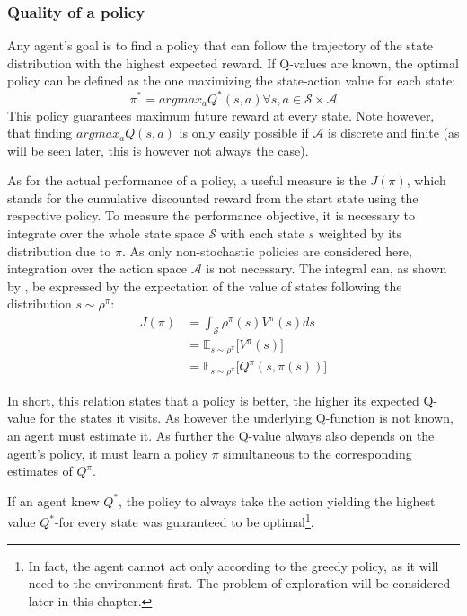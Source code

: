 \subsubsection{Quality of a policy}

Any agent's goal is to find a policy that can follow the trajectory of the state distribution with the highest expected reward. If Q-values are known, the optimal policy can be defined as the one maximizing the state-action value for each state:
\begin{equation}
	\pi^* = argmax_aQ^*(s,a) \forall s,a \in \mathcal{S} \times \mathcal{A}
\end{equation}
This policy guarantees maximum future reward at every state. Note however, that finding $argmax_aQ(s,a)$ is only easily possible if $\mathcal{A}$ is discrete and finite (as will be seen later, this is however not always the case).

As for the actual performance of a policy, a useful measure is the  $J(\pi)$, which stands for the cumulative discounted reward from the start state using the respective policy. To measure the performance objective, it is necessary to integrate over the whole state space $\mathcal{S}$ with each state $s$ weighted by its distribution due to $\pi$. As only non-stochastic policies are considered here, integration over the action space $\mathcal{A}$ is not necessary. The integral can, as shown by \cite{silver_deterministic_2014}, be expressed by the expectation of the value of states following the distribution $s\sim\rho^\pi$:
\begin{align}
	J(\pi) &= \int_\mathcal{S} \rho^\pi(s) V^\pi(s) ds \nonumber\\
	       &= \mathds{E}_{s\sim\rho^\pi} \big[V^\pi(s)] \nonumber\\
	       &= \mathds{E}_{s\sim\rho^\pi} \big[Q^\pi(s, \pi(s))] \label{eq:performance01}
\end{align}

In short, this relation states that a policy is better, the higher its expected Q-value for the states it visits. As however the underlying Q-function is not known, an agent must estimate it. As further the Q-value always also depends on the agent's policy, it must learn a policy $\pi$ simultaneous to the corresponding estimates of $Q^\pi$. 

If an agent knew $Q^*$, the  policy to always take the action yielding the highest value $Q^*$-for every state was guaranteed to be optimal\footnote{\label{footnote:explore} In fact, the agent cannot act only according to the greedy policy, as it will need to  the environment first. The problem of exploration will be considered later in this chapter.}.

